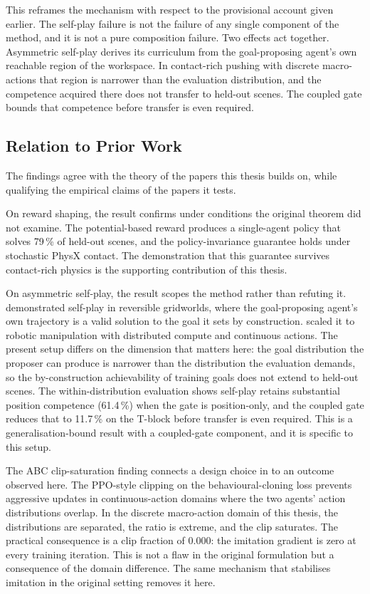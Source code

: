 This reframes the mechanism with respect to the provisional account given
earlier. The self-play failure is not the failure of any single component of the
method, and it is not a pure composition failure. Two effects act together.
Asymmetric self-play derives its curriculum from the goal-proposing agent's own
reachable region of the workspace. In contact-rich pushing with discrete
macro-actions that region is narrower than the evaluation distribution, and the
competence acquired there does not transfer to held-out scenes. The coupled gate
bounds that competence before transfer is even required.

\subsection{Relation to Prior Work}
\label{sec:relation}

The findings agree with the theory of the papers this thesis builds on, while
qualifying the empirical claims of the papers it tests.

On reward shaping, the result confirms \cite{Ng1999PolicyInvariance} under
conditions the original theorem did not examine. The potential-based reward
produces a single-agent policy that solves 79\,\% of held-out scenes, and the
policy-invariance guarantee holds under stochastic PhysX contact. The
demonstration that this guarantee survives contact-rich physics is the
supporting contribution of this thesis.

On asymmetric self-play, the result scopes the method rather than refuting it.
\cite{Sukhbaatar2018IntrinsicMotivation} demonstrated self-play in reversible
gridworlds, where the goal-proposing agent's own trajectory is a valid solution
to the goal it sets by construction. \cite{OpenAI2021AsymmetricSF} scaled it to
robotic manipulation with distributed compute and continuous actions. The
present setup differs on the dimension that matters here: the goal distribution the
proposer can produce is narrower than the distribution the evaluation demands,
so the by-construction achievability of training goals does not extend to
held-out scenes. The within-distribution evaluation shows self-play retains
substantial position competence (61.4\,\%) when the gate is position-only, and
the coupled gate reduces that to 11.7\,\% on the T-block before transfer is even
required. This is a generalisation-bound result with a coupled-gate component,
and it is specific to this setup.

The ABC clip-saturation finding connects a design choice in
\cite{OpenAI2021AsymmetricSF} to an outcome observed here. The PPO-style
clipping on the behavioural-cloning loss prevents aggressive updates in
continuous-action domains where the two agents' action distributions overlap.
In the discrete macro-action domain of this thesis, the distributions are
separated, the ratio is extreme, and the clip saturates. The practical
consequence is a clip fraction of 0.000: the imitation gradient is zero at every
training iteration. This is not a flaw in the original formulation but a
consequence of the domain difference. The same mechanism that stabilises
imitation in the original setting removes it here.


